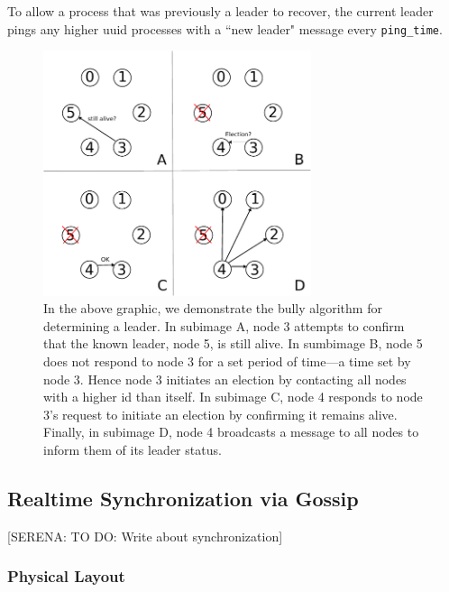 \documentclass[preprint,review,12pt]{cs262}
\newcommand{\note}[3]{{\color{#2}[#1: #3]}}
\newcommand{\SERENA}[1]{\note{SERENA}{red}{#1}}
\begin{document}
To allow a process that was previously a leader to recover, the current leader pings any higher uuid processes with a ``new leader" message every \texttt{ping\_time}.

\begin{figure}[h]
  \centering
  \includegraphics[width=0.7\textwidth]{figures/bully}
  \caption{In the above graphic, we demonstrate the bully algorithm for determining a leader. In subimage A, node 3 attempts to confirm that the known leader, node 5, is still alive. In sumbimage B, node 5 does not respond to node 3 for a set period of time---a time set by node 3. Hence node 3 initiates an election by contacting all nodes with a higher id than itself. In subimage C, node 4 responds to node 3's request to initiate an election by confirming it remains alive. Finally, in subimage D, node 4 broadcasts a message to all nodes to inform them of its leader status. 
 \label{fig:bully}}
\end{figure} 


\subsection{Realtime Synchronization via Gossip}
\SERENA{TO DO: Write about synchronization}
\subsubsection{Physical Layout}
\end{document}

